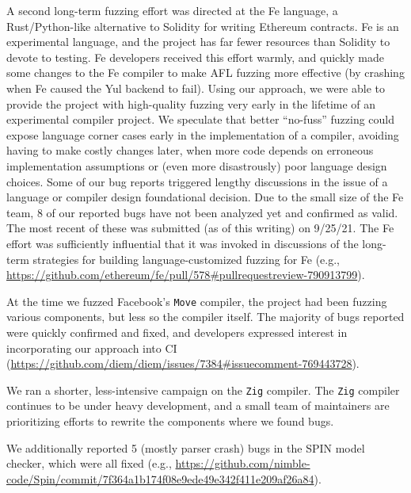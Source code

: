 A second long-term fuzzing effort was directed at the Fe language, a Rust/Python-like alternative to Solidity for writing Ethereum contracts.  Fe is an experimental language, and the project has far fewer resources than Solidity to devote to testing.  Fe developers received this effort warmly, and quickly made some changes to the Fe compiler to make AFL fuzzing more effective (by crashing when Fe caused the Yul backend to fail).  Using our approach, we were able to provide the project with high-quality fuzzing very early in the lifetime of an experimental compiler project.  We speculate that better ``no-fuss'' fuzzing could expose language corner cases early in the implementation of a compiler, avoiding having to make costly changes later, when more code depends on erroneous implementation assumptions or (even more disastrously) poor language design choices.  Some of our bug reports triggered lengthy discussions in the issue of a language or compiler design foundational decision.  Due to the small size of the Fe team, 8 of our reported bugs have not been analyzed yet and confirmed as valid.  The most recent of these was submitted (as of this writing) on 9/25/21.  The Fe effort was sufficiently influential that it was invoked in discussions of the long-term strategies for building language-customized fuzzing for Fe (e.g., \url{https://github.com/ethereum/fe/pull/578#pullrequestreview-790913799}).

At the time we fuzzed Facebook's \texttt{Move} compiler, the project had been fuzzing various components, but less so the compiler itself.
The majority of bugs reported were quickly confirmed and fixed, and developers expressed interest in incorporating our approach into CI (\url{https://github.com/diem/diem/issues/7384#issuecomment-769443728}).


We ran a shorter, less-intensive campaign on the \texttt{Zig} compiler.  The
\texttt{Zig} compiler continues to be under heavy development, and a small team
of maintainers are prioritizing efforts to rewrite the components where we found
bugs.

\begin{sloppypar}
  We additionally reported 5 (mostly parser crash) bugs in the SPIN model checker, which were all fixed (e.g., \url{https://github.com/nimble-code/Spin/commit/7f364a1b174f08e9ede49e342f411e209af26a84}).
  \end{sloppypar}
